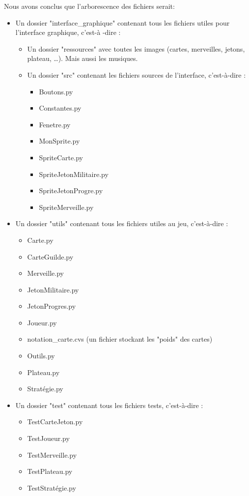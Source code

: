 \documentclass[a4paper, 12pt, french]{article}
\begin{document}
	Nous avons conclus que l'arborescence des fichiers serait:
	\begin{itemize}
		\item Un dossier "interface\_graphique" contenant tous les fichiers utiles pour l'interface graphique, c'est-à
		-dire :
		\begin{itemize}
			\item Un dossier "ressources" avec toutes les images (cartes, merveilles, jetons, plateau, \ldots). Mais
			aussi les musiques.
			\item Un dossier "src" contenant les fichiers sources de l'interface, c'est-à-dire :
			\begin{itemize}
				\item Boutons.py
				\item Constantes.py
				\item Fenetre.py
				\item MonSprite.py
				\item SpriteCarte.py
				\item SpriteJetonMilitaire.py
				\item SpriteJetonProgre.py
				\item SpriteMerveille.py
			\end{itemize}
		\end{itemize}
		\item Un dossier "utils" contenant tous les fichiers utiles au jeu, c'est-à-dire :
		\begin{itemize}
			\item Carte.py
			\item CarteGuilde.py
			\item Merveille.py
			\item JetonMilitaire.py
			\item JetonProgres.py
			\item Joueur.py
			\item notation\_carte.cvs (un fichier stockant les "poids" des cartes)
			\item Outils.py
			\item Plateau.py
			\item Stratégie.py
		\end{itemize}
		\item Un dossier "test" contenant tous les fichiers tests, c'est-à-dire :
		\begin{itemize}
			\item TestCarteJeton.py
			\item TestJoueur.py
			\item TestMerveille.py
			\item TestPlateau.py
			\item TestStratégie.py
		\end{itemize}
	\end{itemize}
\end{document}
